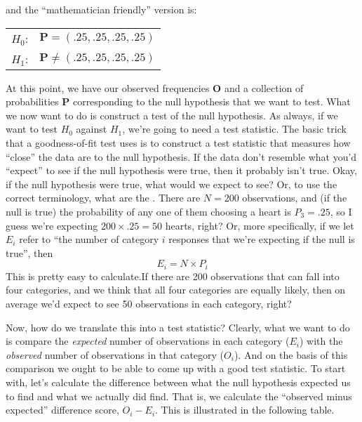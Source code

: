 \noindent
and the ``mathematician friendly'' version is:

\smallskip
\begin{tabular}{ll}
$H_0$:\hspace*{0.5cm}  &  $\bm{P} = (.25, .25, .25, .25)$ \\
$H_1$: \hspace*{0.5cm} & $\bm{P} \neq (.25,.25,.25,.25)$ \\
\end{tabular} 
\smallskip

\vspace{0.5cm}


At this point, we have our observed frequencies $\bm{O}$ and a collection of probabilities $\bm{P}$ corresponding to the null hypothesis that we want to test. What we now want to do is construct a test of the null hypothesis. As always, if we want to test $H_0$ against $H_1$, we're going to need a test statistic. The basic trick that a goodness-of-fit test uses is to construct a test statistic that measures how ``close'' the data are to the null hypothesis. If the data don't resemble what you'd ``expect'' to see if the null hypothesis were true, then it probably isn't true. Okay, if the null hypothesis were true, what would we expect to see? Or, to use the correct terminology, what are the . There are $N=200$ observations, and (if the null is true) the probability of any one of them choosing a heart is $P_3 = .25$, so I guess we're expecting $200 \times .25 = 50$ hearts, right? Or, more specifically, if we let $E_i$ refer  to ``the number of category $i$ responses that we're expecting if the null is true'', then
$$
E_i = N \times P_i
$$
This is pretty easy to calculate.If there are 200 observations that can fall into four categories, and we think that all four categories are equally likely, then on average we'd expect to see 50 observations in each category, right?

Now, how do we translate this into a test statistic? Clearly, what we want to do is compare the {\it expected} number of observations in each category ($E_i$) with the {\it observed} number of observations in that category ($O_i$). And on the basis of this comparison we ought to be able to come up with a good test statistic. To start with, let's calculate the difference between what the null hypothesis expected us to find and what we actually did find. That is, we calculate the ``observed minus expected'' difference score, $O_i - E_i$. This is illustrated in the following table. 

